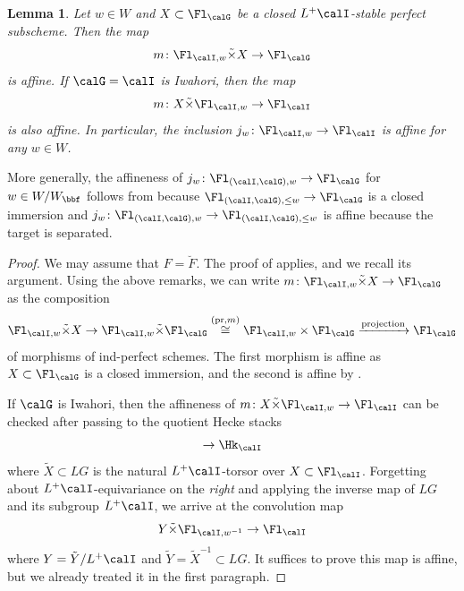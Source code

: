 \documentclass[10pt, reqno]{amsart}
\theoremstyle{plain}
\newtheorem{lemma}[theorem]{Lemma}
\theoremstyle{definition}
\numberwithin{equation}{section}
\begin{document}
	\begin{lemma}
		\label{sec:geometry-affine-flag-4-convolution-is-affine}
		Let $w\in W$ and $X\subset \Fl_{\calG}$ be a closed $L^+\calI$-stable perfect subscheme. Then the map
		\begin{equation}
			m\colon  \Fl_{\calI,w}\tilde{\times} X\to \Fl_{\calG}
		\end{equation}
		is affine. If $\calG=\calI$ is Iwahori, then the map
		\begin{equation}
			m\colon X \tilde{\times}\Fl_{\calI, w}\to \Fl_{\calI}
		\end{equation}
		is also affine. In particular, the inclusion $j_w\colon \Fl_{\calI, w}\to \Fl_{\calI}$ is affine for any $w\in W$.
	\end{lemma}
	More generally,	the affineness of $j_w \colon \Fl_{(\calI,\calG), w}\to \Fl_{\calG} $ for $w \in W/W_\bbf$ follows from  because $\Fl_{(\calI,\calG),\leq w}\to \Fl_{\calG}$ is a closed immersion and $j_w\colon \Fl_{(\calI,\calG),w}\to \Fl_{(\calI,\calG), \leq w}$ is affine because the target is separated.
	\begin{proof}
		We may assume that $F=\breve{F}$. The proof of \cite[Lemma 4.1.6]{AR} applies, and we recall its argument. Using the above remarks, we can write $m\colon \Fl_{\calI, w}\tilde{\times} X\to \Fl_{\calG}$ as the composition
		\begin{equation}
			\Fl_{\calI, w}\tilde{\times} X\to \Fl_{\calI,w}\tilde{\times} \Fl_{\calG}\overset{(\mathrm{pr},m)}{\cong} \Fl_{\calI,w}\times \Fl_{\calG}\xrightarrow{\textrm{projection}} \Fl_{\calG}   
		\end{equation}
		of morphisms of ind-perfect schemes. The first morphism is affine as $X\subset \Fl_{\calG}$ is a closed immersion, and the second is affine by . 
		
		If $\calG$ is Iwahori, then the affineness of $m\colon X\tilde{\times}\Fl_{ \calI,w} \to \Fl_{ \calI}$ can be checked after passing to the quotient Hecke stacks
		\begin{equation}
			[L^+\calI \backslash \tilde{X} \times^{L^+\calI} \Fl_{ \calI,w}] \to \Hk_{\calI}
		\end{equation}
		where $\tilde{X}\subset LG$ is the natural $L^+\calI$-torsor over $X \subset \Fl_{ \calI}$.
		Forgetting about $L^+ \calI$-equivariance on the {\it right} and applying the inverse map of $LG$ and its subgroup $L^+\calI$, we arrive at the convolution map
		\begin{equation}
			Y\tilde{\times}\Fl_{ \calI,w^{-1}}\to \Fl_{ \calI}
		\end{equation}
		where $Y=\tilde{Y}/L^+\calI$ and $\tilde{Y}=\tilde{X}^{-1} \subset LG$. It suffices to prove this map is affine, but we already treated it in the first paragraph.
	\end{proof}
	
\end{document}
